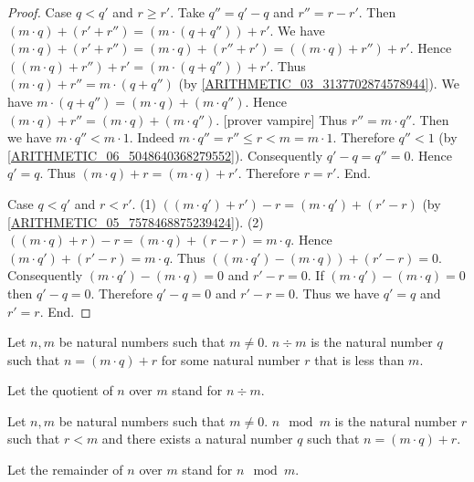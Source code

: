 \documentclass[../arithmetic.tex]{subfiles}
\begin{document}
\begin{forthel}
\begin{proof}
      Case $q < q'$ and $r \geq r'$.
        Take $q'' = q' - q$ and $r'' = r - r'$.
        Then $(m \cdot q) + (r' + r'') = (m \cdot (q + q'')) + r'$.
        We have $(m \cdot q) + (r' + r'')
          = (m \cdot q) + (r'' + r')
          = ((m \cdot q) + r'') + r'$.
        Hence $((m \cdot q) + r'') + r' = (m \cdot (q + q'')) + r'$.
        Thus $(m \cdot q) + r'' = m \cdot (q + q'')$
        (by \cref{ARITHMETIC_03_3137702874578944}).
        We have $m \cdot (q + q'') = (m \cdot q) + (m \cdot q'')$.
        Hence $(m \cdot q) + r'' = (m \cdot q) + (m \cdot q'')$.
        [prover vampire]
        Thus $r'' = m \cdot q''$.
        Then we have $m \cdot q'' < m \cdot 1$.
        Indeed $m \cdot q''
          = r''
          \leq r
          < m
          = m \cdot 1$.
        Therefore $q'' < 1$ (by \cref{ARITHMETIC_06_5048640368279552}).
        Consequently $q' - q = q'' = 0$.
        Hence $q' = q$.
        Thus $(m \cdot q) + r = (m \cdot q) + r'$.
        Therefore $r = r'$.
      End.

      Case $q < q'$ and $r < r'$.
        (1) $((m \cdot q') + r') - r = (m \cdot q') + (r' - r)$
        (by \cref{ARITHMETIC_05_7578468875239424}).
        (2) $((m \cdot q) + r) - r
          = (m \cdot q) + (r - r)
          = m \cdot q$.
        Hence $(m \cdot q') + (r' - r) = m \cdot q$.
        Thus $((m \cdot q') - (m \cdot q)) + (r' - r) = 0$.
        Consequently $(m \cdot q') - (m \cdot q) = 0$ and $r' - r = 0$.
        If $(m \cdot q') - (m \cdot q) = 0$ then $q' - q = 0$.
        Therefore $q' - q = 0$ and $r' - r = 0$.
        Thus we have $q' = q$ and $r' = r$.
      End.
    \end{proof}
  \end{forthel}

  \begin{forthel}
    \begin{definition}
      Let $n, m$ be natural numbers such that $m \neq 0$.
      $n \div m$ is the natural number $q$ such that $n = (m \cdot q) + r$ for
      some natural number $r$ that is less than $m$.
    \end{definition}

    Let the quotient of $n$ over $m$ stand for $n \div m$.
  \end{forthel}

  \begin{forthel}
    \begin{definition}
      Let $n, m$ be natural numbers such that $m \neq 0$.
      $n \mod m$ is the natural number $r$ such that $r < m$ and there exists a
      natural number $q$ such that $n = (m \cdot q) + r$.
    \end{definition}

    Let the remainder of $n$ over $m$ stand for $n \mod m$.
  \end{forthel}
\end{document}
